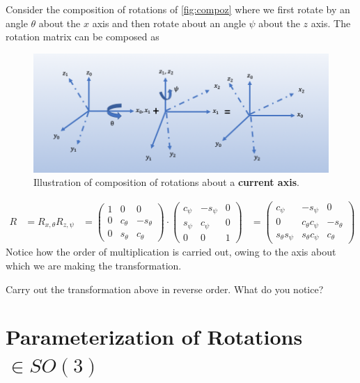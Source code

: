 Consider the composition of rotations of \autoref{fig:compoz} where we first rotate by an angle $\theta$ about the $x$ axis and then rotate about an angle $\psi$ about the $z$ axis. The rotation matrix can be composed as 
%
\begin{figure}[tb!]
	\centering
	\includegraphics[width=\columnwidth]{figures/compoz.png}
	\caption{Illustration of composition of rotations about a \textbf{current axis}.}
	\label{fig:compoz}
\end{figure}
%
\begin{align}
R &= R_{x, \theta} R_{z, \psi} 
%
&= \left(\begin{array}{ccc}
1 & 0 & 0 \\
0 & c_\theta & -s_\theta \\
0 & s_\theta & c_\theta
\end{array}\right) 
%
\cdot
%
\left(\begin{array}{ccc}
c_\psi & -s_\psi & 0 \\
s_\psi & c_\psi & 0 \\
0 & 0 & 1
\end{array}\right)
%
&= \left(\begin{array}{ccc}
c_\psi & -s_\psi & 0 \\
0 & c_\theta c_\psi &  -s_\theta \\
s_\theta s_\psi & s_\theta c_\psi & c_\theta 
\end{array}\right)
\end{align}
%
Notice how the order of multiplication is carried out, owing to the axis about which we are making the transformation. 

\noindent 
\begin{homework}
	Carry out the transformation above in reverse order. What do you notice?
\end{homework} 


\section{Parameterization of Rotations $\in SO(3)$}
%
